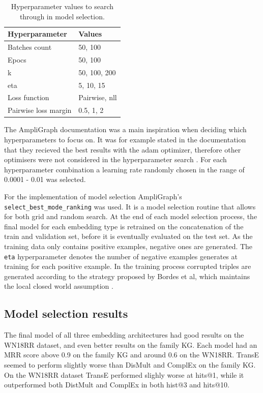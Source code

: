 \begin{table}[h]
\centering
\begin{tabular}{|l|l|}
\hline
\textbf{Hyperparameter}      & \textbf{Values}             \\ \hline
Batches count       & 50, 100                              \\ \hline
Epocs               & 50, 100                          \\ \hline
k                   & 50, 100, 200                     \\ \hline
eta                 & 5, 10, 15                            \\ \hline
Loss function   & Pairwise, nll                         \\ \hline
Pairwise loss margin    & 0.5, 1, 2                    \\ \hline
\end{tabular}
\caption{Hyperparameter values to search through in model selection.}
\end{table}
The AmpliGraph documentation was a main inspiration when deciding which hyperparameters to focus on. It was for example stated in the documentation that they recieved the best results with the adam optimizer, therefore other optimisers were not considered in the hyperparameter search \cite{ampligraph_documentation}. For each hyperparameter combination a learning rate randomly chosen in the range of 0.0001 - 0.01 was selected. 

For the implementation of model selection AmpliGraph's \texttt{select\_best\_mode\_ranking} was used. It is a model selection routine that allows for both grid and random search. At the end of each model selection process, the final model for each embedding type is retrained on the concatenation of the train and validation set, before it is eventually evaluated on the test set. As the training data only contains positive examples, negative ones are generated. The \texttt{eta} hyperparameter denotes the number of negative examples generates at training for each positive example. In the training process corrupted triples are generated according to the strategy proposed by Bordes et al, which maintains the local closed world assumption \cite{TransE}.


\subsection{Model selection results}
The final model of all three embedding architectures had good results on the WN18RR dataset, and even better results on the family KG. Each model had an MRR score above 0.9 on the family KG and around 0.6 on the WN18RR. TransE seemed to perform slightly worse than DisMult and ComplEx on the family KG. On the WN18RR dataset TransE performed slighly worse at hits@1, while it outperformed both DistMult and ComplEx in both hist@3 and hits@10.


